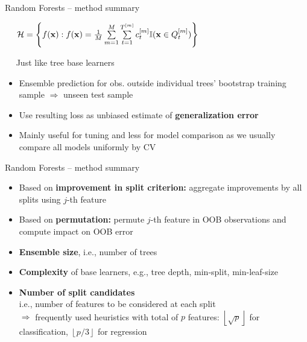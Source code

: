 \begin{frame2}{Random Forests -- method summary}

 ~~
$\mathcal{H} = \left\{ f(\mathbf{x}): f(\mathbf{x}) = \frac{1}{M} \sum\limits_{m = 1}^M 
\sum\limits_{t = 1}^{T^{[m]}} 
c_t^{[m]} \mathbb{I}(\mathbf{x} \in Q_t^{[m]}) \right\}$



 ~~ Just like tree base learners


\begin{itemize}
  \item Ensemble prediction for obs. outside individual trees' bootstrap training sample $\Rightarrow$ unseen test sample
  \item Use resulting loss as unbiased estimate of \textbf{generalization error}
  \item Mainly useful for tuning and less for model comparison as we usually compare all models uniformly by CV
\end{itemize}

\end{frame2}

\begin{frame2}{Random Forests -- method summary}


\begin{itemize}
  \item Based on \textbf{improvement in split criterion:} aggregate improvements 
  by all splits using $j$-th feature
  \item Based on \textbf{permutation:} permute $j$-th feature in 
  OOB observations and compute impact on OOB error
\end{itemize}



\begin{itemize}
  \item \textbf{Ensemble size}, i.e., number of trees
  \item \textbf{Complexity} of base learners, e.g., tree depth, min-split, min-leaf-size
  \item \textbf{Number of split candidates}\\i.e., number of features to be considered at each split \\
  $\Rightarrow$ frequently used heuristics with total of $p$ features: 
  $\left \lfloor{\sqrt{p}}\right \rfloor$ for classification, $\left \lfloor{p/3}\right \rfloor$ for regression
\end{itemize}

\end{frame2}

